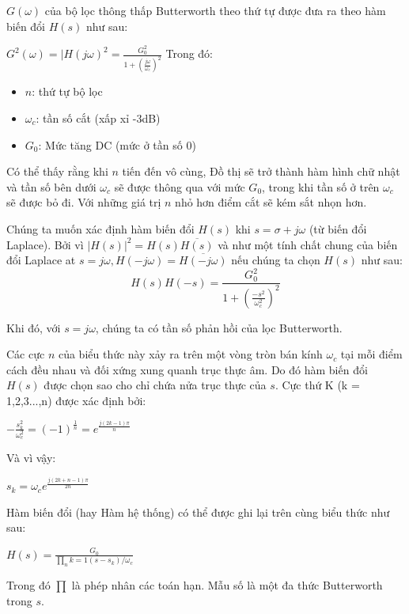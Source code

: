 $G(\omega)$ của bộ lọc thông thấp Butterworth theo thứ tự được đưa ra theo hàm biến đổi $H(s)$ như sau:\\\par
$G^2(\omega) = \vert{H(j\omega)}^2 = \frac{G_0^2}{1+(\frac{j\omega}{\omega_c})^2}$
Trong đó:
\begin{center}
    \begin{itemize}
        \item $n$: thứ tự bộ lọc 
        \item $\omega_c$: tần số cắt (xấp xỉ -3dB)
        \item $G_0$: Mức tăng DC (mức ở tần số 0)
    \end{itemize}
\end{center}
Có thể thấy rằng khi $n$ tiến đến vô cùng, Đồ thị sẽ trở thành hàm hình chữ nhật và tần số bên dưới $\omega_c$ sẽ được thông qua với mức $G_0$, trong khi tần số ở trên $\omega_c$ sẽ được bỏ đi. Với những giá trị $n$ nhỏ hơn điểm cắt sẽ kém sắt nhọn hơn.\par
Chúng ta muốn xác định hàm biến đổi $H(s)$ khi $s = \sigma + j\omega$ (từ biến đổi Laplace). Bởi vì $\vert H(s) \vert^2 = H(s)\overline{H(s)}$ và như một tính chất chung của biến đổi Laplace
at $s = j\omega, H(-j\omega) = \overline{H(-j\omega)}$ nếu chúng ta chọn $H(s)$ như sau:
\begin{equation}
H(s)H(-s)=\frac{G_0^2}{1+(\frac{-s^2}{\omega_c^2})^2}
\label{eq:Hs}
\end{equation}

Khi đó, với $s = j\omega$, chúng ta có tần số phản hồi của lọc Butterworth. \par
Các cực $n$ của biểu thức này xảy ra trên một vòng tròn bán kính $\omega_c$ tại mỗi điểm cách đều nhau và đối xứng xung quanh trục thực âm. Do đó hàm biến đổi $H(s)$ được chọn sao cho chỉ chứa nửa trục thực của $s$. Cực thứ K (k = 1,2,3...,n) được xác định bởi:\\\par
$-\frac{s_k^2}{\omega_c^2} = (-1)^\frac{1}{n} = e^\frac{j(2k-1)\pi}{n}$ \\\par
Và vì vậy: \\\par
$s_k = \omega_c e^\frac{j(2k+n-1)\pi}{2n}$ \\\par
Hàm biến đổi (hay Hàm hệ thống) có thể được ghi lại trên cùng biểu thức như sau: \\\par
$H(s) = \frac{G_0}{\prod_{n}{k=1}(s - s_k)/\omega_c}$ \\\par
Trong đó $\prod$ là phép nhân các toán hạn. Mẫu số là một đa thức Butterworth trong $s$.

